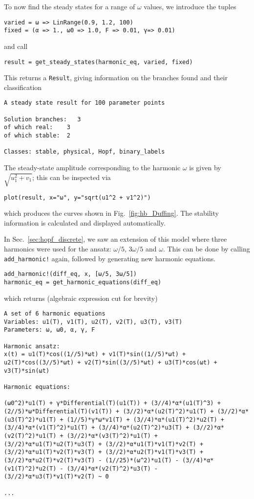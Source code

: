 To now find the steady states for a range of $\omega$ values, we introduce the tuples
%
\begin{lstlisting}[numbers=none]
varied = ω => LinRange(0.9, 1.2, 100)
fixed = (α => 1., ω0 => 1.0, F => 0.01, γ=> 0.01)
\end{lstlisting}
%
and call
%
\begin{lstlisting}[numbers=none]
result = get_steady_states(harmonic_eq, varied, fixed)
\end{lstlisting}
%
This returns a \texttt{Result}, giving information on the branches found and their classification
\begin{lstlisting}[numbers=none, basicstyle=\scriptsize\ttfamily, keywordstyle=\color{black}]
A steady state result for 100 parameter points

Solution branches:   3
of which real:    3
of which stable:  2

Classes: stable, physical, Hopf, binary_labels
\end{lstlisting}
The steady-state amplitude corresponding to the harmonic $\omega$ is given by $\sqrt{u_1^2+v_1}$; this can be inspected via
%
\begin{lstlisting}[numbers=none]
plot(result, x="ω", y="sqrt(u1^2 + v1^2)")
\end{lstlisting}
%
which produces the curves shown in Fig.~\ref{fig:hb_Duffing}. The stability information is calculated and displayed automatically. 
%

In Sec.~\ref{sec:hopf_discrete}, we saw an extension of this model where three harmonics were used for the ansatz: $\omega/5$, $3\omega/5$ and $\omega$. This can be done by calling \texttt{add\_harmonic!} again, followed by generating new harmonic equations.
\begin{lstlisting}[numbers=none]
add_harmonic!(diff_eq, x, [ω/5, 3ω/5]) 
harmonic_eq = get_harmonic_equations(diff_eq)
\end{lstlisting}
%
which returns (algebraic expression cut for brevity)
\begin{lstlisting}[numbers=none, basicstyle=\scriptsize\ttfamily]
A set of 6 harmonic equations
Variables: u1(T), v1(T), u2(T), v2(T), u3(T), v3(T)
Parameters: ω, ω0, α, γ, F

Harmonic ansatz: 
x(t) = u1(T)*cos((1//5)*ωt) + v1(T)*sin((1//5)*ωt) + u2(T)*cos((3//5)*ωt) + v2(T)*sin((3//5)*ωt) + u3(T)*cos(ωt) + v3(T)*sin(ωt)

Harmonic equations:

(ω0^2)*u1(T) + γ*Differential(T)(u1(T)) + (3//4)*α*(u1(T)^3) + (2//5)*ω*Differential(T)(v1(T)) + (3//2)*α*(u2(T)^2)*u1(T) + (3//2)*α*(u3(T)^2)*u1(T) + (1//5)*γ*ω*v1(T) + (3//4)*α*(u1(T)^2)*u2(T) + (3//4)*α*(v1(T)^2)*u1(T) + (3//4)*α*(u2(T)^2)*u3(T) + (3//2)*α*(v2(T)^2)*u1(T) + (3//2)*α*(v3(T)^2)*u1(T) + (3//2)*α*u1(T)*u2(T)*u3(T) + (3//2)*α*u1(T)*v1(T)*v2(T) + (3//2)*α*u1(T)*v2(T)*v3(T) + (3//2)*α*u2(T)*v1(T)*v3(T) + (3//2)*α*u2(T)*v2(T)*v3(T) - (1//25)*(ω^2)*u1(T) - (3//4)*α*(v1(T)^2)*u2(T) - (3//4)*α*(v2(T)^2)*u3(T) - (3//2)*α*u3(T)*v1(T)*v2(T) ~ 0

...
\end{lstlisting}


